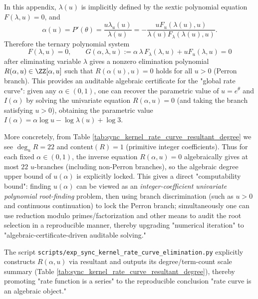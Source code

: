 \begin{remark}\label{rem:rate-algebraic-elimination}
In this appendix, \(\lambda(u)\) is implicitly defined by the sextic polynomial equation \(F(\lambda,u)=0\), and
\[
\alpha(u)=P'(\theta)=\frac{u\lambda_u(u)}{\lambda(u)}
=-\frac{uF_u(\lambda(u),u)}{\lambda(u)F_\lambda(\lambda(u),u)}.
\]
Therefore the ternary polynomial system
\[
F(\lambda,u)=0,\qquad
G(\alpha,\lambda,u):=\alpha\,\lambda\,F_\lambda(\lambda,u)+uF_u(\lambda,u)=0
\]
after eliminating variable \(\lambda\) gives a nonzero elimination polynomial
\(
R(\alpha,u)\in\ZZ[\alpha,u]
\)
such that \(R(\alpha(u),u)=0\) holds for all \(u>0\) (Perron branch).
This provides an auditable algebraic certificate for the "global rate curve": given any \(\alpha\in(0,1)\), one can recover the parametric value of \(u=e^\theta\) and \(I(\alpha)\) by solving the univariate equation \(R(\alpha,u)=0\) (and taking the branch satisfying \(u>0\)), obtaining the parametric value \(I(\alpha)=\alpha\log u-\log\lambda(u)+\log 3\).
\par
\noindent More concretely, from Table \ref{tab:sync_kernel_rate_curve_resultant_degree} we see \(\deg_u R=22\) and \(\mathrm{content}(R)=1\) (primitive integer coefficients).
Thus for each fixed \(\alpha\in(0,1)\), the inverse equation \(R(\alpha,u)=0\) algebraically gives at most \(22\) \(u\)-branches (including non-Perron branches), so the algebraic degree upper bound of \(u(\alpha)\) is explicitly locked.
This gives a direct "computability bound": finding \(u(\alpha)\) can be viewed as an \emph{integer-coefficient univariate polynomial root-finding} problem, then using branch discrimination (such as \(u>0\) and continuous continuation) to lock the Perron branch; simultaneously one can use reduction modulo primes/factorization and other means to audit the root selection in a reproducible manner, thereby upgrading "numerical iteration" to "algebraic-certificate-driven auditable solving."
\par
The script \texttt{scripts/exp\_sync\_kernel\_rate\_curve\_elimination.py} explicitly constructs \(R(\alpha,u)\) via resultant and outputs its degree/term-count scale summary (Table \ref{tab:sync_kernel_rate_curve_resultant_degree}), thereby promoting "rate function is a series" to the reproducible conclusion "rate curve is an algebraic object."
\end{remark}

